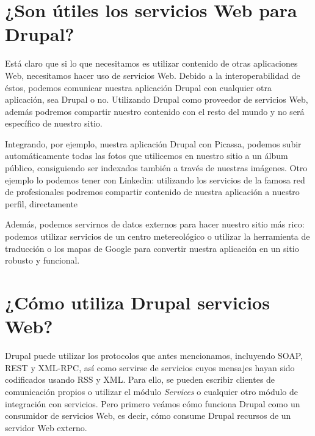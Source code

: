 \section{¿Son útiles los servicios Web para Drupal?}
Está claro que si lo que necesitamos es utilizar contenido de otras aplicaciones Web, necesitamos hacer 
uso de servicios Web. Debido a la interoperabilidad de éstos, podemos comunicar nuestra aplicación Drupal 
con cualquier otra aplicación, sea Drupal o no. Utilizando Drupal como proveedor de servicios Web, además 
podremos compartir nuestro contenido con el resto del mundo y no será específico de nuestro sitio.
 
Integrando, por ejemplo, nuestra aplicación Drupal con Picassa, podemos subir automáticamente todas las 
fotos que utilicemos en nuestro sitio a un álbum público, consiguiendo ser indexados también a través de 
nuestras imágenes. Otro ejemplo lo podemos tener con Linkedin: utilizando los servicios de la famosa red de 
profesionales podremos compartir contenido de nuestra aplicación a nuestro perfil, directamente  

Además, podemos servirnos de datos externos para hacer nuestro sitio más rico: podemos utilizar servicios 
de un centro metereológico o utilizar la herramienta de traducción o los mapas de Google para 
convertir nuestra aplicación en un sitio robusto y funcional. 

\section{¿Cómo utiliza Drupal servicios Web?}

Drupal puede utilizar los protocolos que antes mencionamos, incluyendo SOAP, REST y XML-RPC, así como 
servirse de servicios cuyos mensajes hayan sido codificados usando RSS y XML. Para ello, se pueden escribir 
clientes de comunicación propios o utilizar el módulo \textit{Services} o cualquier otro módulo de integración 
con servicios. Pero primero veámos cómo funciona Drupal como un consumidor de servicios Web, es decir, 
cómo consume Drupal recursos de un servidor Web externo.



 